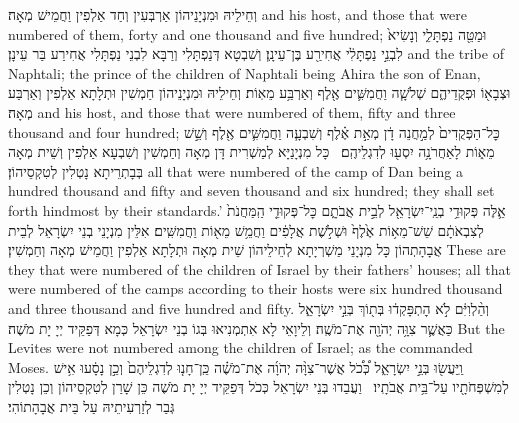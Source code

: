 {וְחֵילֵיהּ וּמִנְיָנֵיהוֹן אַרְבְּעִין וְחַד אַלְפִין וַחֲמֵישׁ מְאָה׃}
{and his host, and those that were numbered of them, forty and one thousand and five hundred;}{}
{וּמַטֵּ֖ה נַפְתָּלִ֑י וְנָשִׂיא֙ לִבְנֵ֣י נַפְתָּלִ֔י אֲחִירַ֖ע בֶּן־עֵינָֽן׃}
{וְשִׁבְטָא דְּנַפְתָּלִי וְרַבָּא לִבְנֵי נַפְתָּלִי אֲחִירַע בַּר עֵינָן׃}
{and the tribe of Naphtali; the prince of the children of Naphtali being Ahira the son of Enan,}{}
{וּצְבָא֖וֹ וּפְקֻדֵיהֶ֑ם שְׁלֹשָׁ֧ה וַחֲמִשִּׁ֛ים אֶ֖לֶף וְאַרְבַּ֥ע מֵאֽוֹת׃}
{וְחֵילֵיהּ וּמִנְיָנֵיהוֹן חַמְשִׁין וּתְלָתָא אַלְפִין וְאַרְבַּע מְאָה׃}
{and his host, and those that were numbered of them, fifty and three thousand and four hundred;}{}
{כׇּל־הַפְּקֻדִים֙ לְמַ֣חֲנֵה דָ֔ן מְאַ֣ת אֶ֗לֶף וְשִׁבְעָ֧ה וַחֲמִשִּׁ֛ים אֶ֖לֶף וְשֵׁ֣שׁ מֵא֑וֹת לָאַחֲרֹנָ֥ה יִסְע֖וּ לְדִגְלֵיהֶֽם׃ \petucha }
{כָּל מִנְיָנַיָּא לְמַשְׁרִית דָּן מְאָה וְחַמְשִׁין וְשִׁבְעָא אַלְפִין וְשֵׁית מְאָה בְּבָתְרֵיתָא נָטְלִין לְטִקְסֵיהוֹן׃}
{all that were numbered of the camp of Dan being a hundred thousand and fifty and seven thousand and six hundred; they shall set forth hindmost by their standards.’}{}
{אֵ֛לֶּה פְּקוּדֵ֥י בְנֵֽי־יִשְׂרָאֵ֖ל לְבֵ֣ית אֲבֹתָ֑ם כׇּל־פְּקוּדֵ֤י הַֽמַּחֲנֹת֙ לְצִבְאֹתָ֔ם שֵׁשׁ־מֵא֥וֹת אֶ֙לֶף֙ וּשְׁלֹ֣שֶׁת אֲלָפִ֔ים וַחֲמֵ֥שׁ מֵא֖וֹת וַחֲמִשִּֽׁים׃}
{אִלֵּין מִנְיָנֵי בְנֵי יִשְׂרָאֵל לְבֵית אֲבָהָתְהוֹן כָּל מִנְיָנֵי מַשְׁרְיָתָא לְחֵילֵיהוֹן שֵׁית מְאָה וּתְלָתָא אַלְפִין וַחֲמֵישׁ מְאָה וְחַמְשִׁין׃}
{These are they that were numbered of the children of Israel by their fathers’ houses; all that were numbered of the camps according to their hosts were six hundred thousand and three thousand and five hundred and fifty.}{}
{וְהַ֨לְוִיִּ֔ם לֹ֣א הׇתְפָּקְד֔וּ בְּת֖וֹךְ בְּנֵ֣י יִשְׂרָאֵ֑ל כַּאֲשֶׁ֛ר צִוָּ֥ה יְהֹוָ֖ה אֶת־מֹשֶֽׁה׃}
{וְלֵיוָאֵי לָא אִתְמְנִיאוּ בְּגוֹ בְנֵי יִשְׂרָאֵל כְּמָא דְּפַקֵּיד יְיָ יָת מֹשֶׁה׃}
{But the Levites were not numbered among the children of Israel; as the \lord\space commanded Moses.}{}
{וַֽיַּעֲשׂ֖וּ בְּנֵ֣י יִשְׂרָאֵ֑ל כְּ֠כֹ֠ל אֲשֶׁר־צִוָּ֨ה יְהֹוָ֜ה אֶת־מֹשֶׁ֗ה כֵּֽן־חָנ֤וּ לְדִגְלֵיהֶם֙ וְכֵ֣ן נָסָ֔עוּ אִ֥ישׁ לְמִשְׁפְּחֹתָ֖יו עַל־בֵּ֥ית אֲבֹתָֽיו׃ \petucha }
{וַעֲבַדוּ בְּנֵי יִשְׂרָאֵל כְּכֹל דְּפַקֵּיד יְיָ יָת מֹשֶׁה כֵּן שָׁרַן לְטִקְסֵיהוֹן וְכֵן נָטְלִין גְּבַר לְזַרְעִיתֵיהּ עַל בֵּית אֲבָהָתוֹהִי׃}
